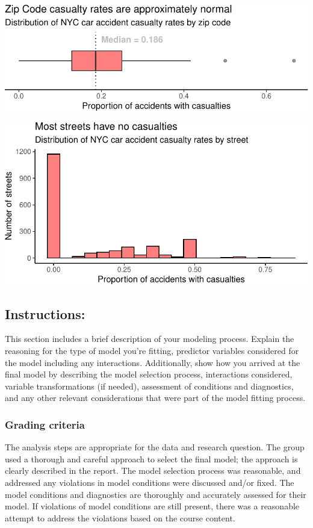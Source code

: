 \documentclass[
  letterpaper,
  DIV=11,
  numbers=noendperiod]{scrartcl}
\begin{document}
\includegraphics{project_files/figure-pdf/viz-zip-code-box-1.pdf}

\includegraphics{project_files/figure-pdf/viz-streets-hist-1.pdf}

\hypertarget{instructions-1}{%
\subsection{Instructions:}\label{instructions-1}}

This section includes a brief description of your modeling process.
Explain the reasoning for the type of model you're fitting, predictor
variables considered for the model including any interactions.
Additionally, show how you arrived at the final model by describing the
model selection process, interactions considered, variable
transformations (if needed), assessment of conditions and diagnostics,
and any other relevant considerations that were part of the model
fitting process.

\hypertarget{grading-criteria-1}{%
\subsubsection{Grading criteria}\label{grading-criteria-1}}

The analysis steps are appropriate for the data and research question.
The group used a thorough and careful approach to select the final
model; the approach is clearly described in the report. The model
selection process was reasonable, and addressed any violations in model
conditions were discussed and/or fixed. The model conditions and
diagnostics are thoroughly and accurately assessed for their model. If
violations of model conditions are still present, there was a reasonable
attempt to address the violations based on the course content.
\end{document}
